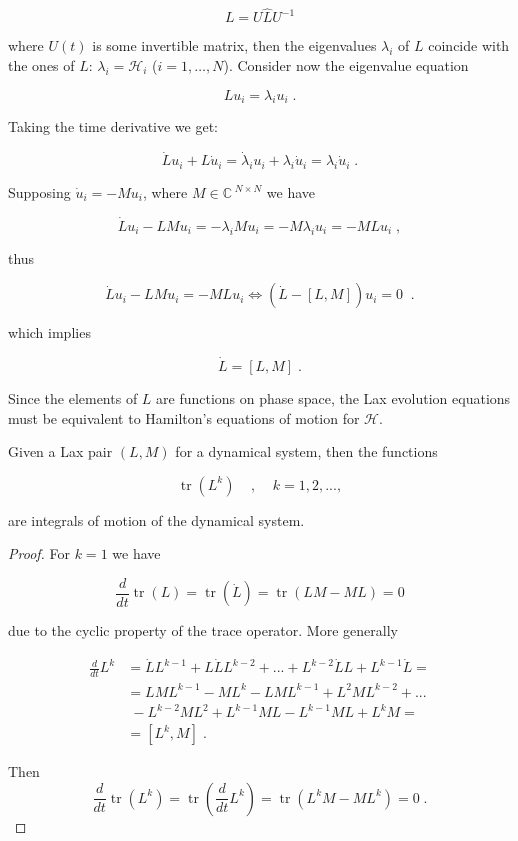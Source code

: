 \[L = U \hat LU^{-1}\]

where $U(t)$ is some invertible matrix, then the eigenvalues $\lambda_i$ of $L$ coincide with the ones of $\hat L$: $\lambda_i = \mathcal{H}_i$ ($i=1, \dots, N$). Consider now the eigenvalue equation

\[Lu_i = \lambda_i u_i\;.\]

Taking the time derivative we get:

\[\dot L u_i + L \dot u_i = \dot \lambda_i u_i + \lambda_i \dot u_i = \lambda_i \dot u_i\;.\]

Supposing $\dot u_i = - M u_i$, where $M \in \mathbb{C}^{\;N\times N}$ we have

\[\dot L u_i - LMu_i = -\lambda_i M u_i = - M \lambda_i u_i = - MLu_i\;,\]

thus

\[\dot L u_i - LMu_i = -MLu_i \iff (\dot L - [L,M])u_i = 0\;\;.\]

which implies

\[\dot L = [L,M]\;.\]

Since the elements of $L$ are functions on phase space, the Lax evolution equations must be equivalent to Hamilton's equations of motion for $\mathcal{H}$.

\begin{thm}
Given a Lax pair $(L,M)$ for a dynamical system, then the functions

\begin{equation}
\operatorname{tr}(L^k)\;\;\;\;,\;\;\;\;k = 1, 2, ..., 
\end{equation}

are integrals of motion of the dynamical system.
\end{thm}

\begin{proof}
    For $k=1$ we have
    
    \[\frac{d}{dt} \operatorname{tr}(L) = \operatorname{tr}(\dot L) = \operatorname{tr}(LM - ML) = 0\]
    
    due to the cyclic property of the trace operator. More generally
    
\begin{equation*}
\begin{split}
\frac{d}{dt}L^k &= \dot L L^{k-1} + L\dot L L^{k-2} + ... + L^{k-2} \dot L L + L^{k-1} \dot L = \\
&= LML^{k-1} - ML^k -LML^{k-1} + L^2ML^{k-2} + ...\\
&\; - L^{k-2}ML^2 + L^{k-1}ML - L^{k-1}ML + L^k M = \\
&= [L^k , M] \;.
\end{split}
\end{equation*}
    
    Then
    \[\frac{d}{dt} \operatorname{tr}(L^k) = \operatorname{tr}(\frac{d}{dt} L^k) = \operatorname{tr}(L^k M - ML^k) = 0\;.\]
\end{proof}

